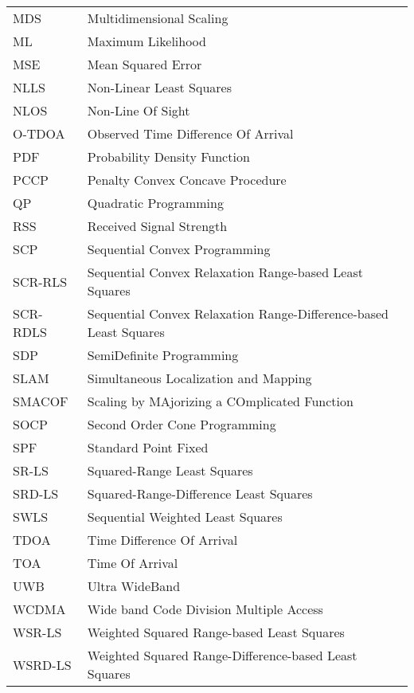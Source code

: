 \begin{longtable}[h]{l l}
MDS & Multidimensional Scaling \\ 

ML & Maximum Likelihood \\

MSE & Mean Squared Error\\

NLLS & Non-Linear Least Squares \\

NLOS & Non-Line Of Sight \\

O-TDOA & Observed Time Difference Of Arrival\\

PDF & Probability Density Function \\

PCCP & Penalty Convex Concave Procedure \\

QP & Quadratic Programming \\

RSS & Received Signal Strength \\

SCP & Sequential Convex Programming \\

SCR-RLS & Sequential Convex Relaxation Range-based Least Squares \\

SCR-RDLS & Sequential Convex Relaxation Range-Difference-based Least Squares\\

SDP & SemiDefinite Programming \\

SLAM & Simultaneous Localization and Mapping  \\

SMACOF & Scaling by MAjorizing a COmplicated Function \\

SOCP & Second Order Cone Programming \\

SPF & Standard  Point Fixed\\

SR-LS  & Squared-Range Least Squares \\

SRD-LS & Squared-Range-Difference Least Squares \\

SWLS & Sequential Weighted Least Squares \\

TDOA &  Time Difference Of Arrival \\

TOA & Time Of Arrival \\

UWB & Ultra WideBand \\

WCDMA & Wide band Code Division Multiple Access \\

WSR-LS & Weighted Squared Range-based Least Squares \\

WSRD-LS & Weighted Squared Range-Difference-based Least Squares \\

\end{longtable}
